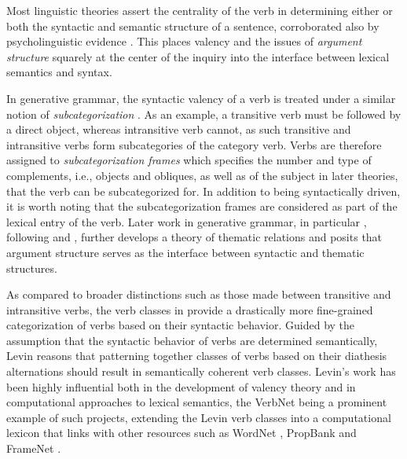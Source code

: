 Most linguistic theories assert the centrality of the verb in determining either or both the syntactic and semantic structure of a sentence, corroborated also by psycholinguistic evidence \citep{healy1970}. This places valency and the issues of \textit{argument structure} squarely at the center of the inquiry into the interface between lexical semantics and syntax.

In generative grammar, the syntactic valency of a verb is treated under a similar notion of \textit{subcategorization} \citep{chomsky1965a}. As an example, a transitive verb must be followed by a direct object, whereas intransitive verb cannot, as such transitive and intransitive verbs form subcategories of the category verb. Verbs are therefore assigned to \textit{subcategorization frames} which specifies the number and type of complements, i.e., objects and obliques, as well as of the subject in later theories, that the verb can be subcategorized for. In addition to being syntactically driven, it is worth noting that the subcategorization frames are considered as part of the lexical entry of the verb. Later work in generative grammar, in particular \citet{jackendoff1972,jackendoff1987,jackendoff1992}, following \citet{katz1963} and \citet{gruber1962}, further develops a theory of thematic relations and posits that argument structure serves as the interface between syntactic and thematic structures.

As compared to broader distinctions such as those made between transitive and intransitive verbs, the verb classes in \citet{levin1993} provide a drastically more fine-grained categorization of verbs based on their syntactic behavior. Guided by the assumption that the syntactic behavior of verbs are determined semantically, Levin reasons that patterning together classes of verbs based on their diathesis alternations should result in semantically coherent verb classes. Levin's work has been highly influential both in the development of valency theory and in computational approaches to lexical semantics, the VerbNet \citep{kipper-schuler2005, kipper2006, kipper2008} being a prominent example of such projects, extending the Levin verb classes into a computational lexicon that links with other resources such as WordNet \citep{fellbaum1998, miller1995}, PropBank \citep{kingsbury2002} and FrameNet \citep{baker1998, fillmore2015}.

